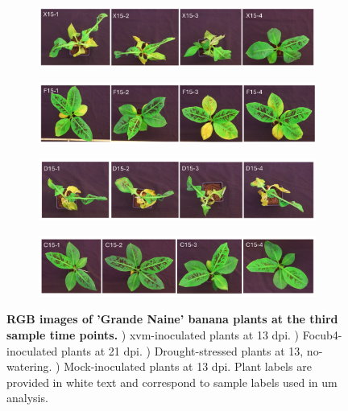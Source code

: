 \begin{figure}[ph!]
  \centering
  \begin{subfigure}[b]{\textwidth}
    \includegraphics[width=\textwidth]{Figures/ThirdTimePointXanthomonasBLQs.pdf}
    \caption{}
    \label{fig:XvmThirdTimeBLQs}
  \end{subfigure}
   \begin{subfigure}[b]{\textwidth}
    \includegraphics[width=\textwidth]{Figures/ThirdTimePointFusariumBLQs.pdf}
    \caption{}
    \label{fig:FocThirdTimeBLQs}
  \end{subfigure}
     \begin{subfigure}[b]{\textwidth}
    \includegraphics[width=\textwidth]{Figures/ThirdTimePointDroughtBLQs.pdf}
    \caption{}
    \label{fig:DroThirdTimeBLQs}
  \end{subfigure}
     \begin{subfigure}[b]{\textwidth}
    \includegraphics[width=\textwidth]{Figures/ThirdTimePointControlBLQs.pdf}
    \caption{}
    \label{fig:ConThirdTimeBLQs}
  \end{subfigure}
  \caption[RGB images of 'Grande Naine' banana plants at the third sample time points.]{\textbf{RGB images of 'Grande Naine' banana plants at the third sample time points.}
  \textbf{}) \acl{xvm}-inoculated plants at 13 \acl{dpi}.
  \textbf{}) \acl{Focub4}-inoculated plants at 21 \acl{dpi}.
  \textbf{}) Drought-stressed plants at 13, no-watering.
  \textbf{}) Mock-inoculated plants at 13 \ac{dpi}.
  Plant labels are provided in white text and correspond to sample labels used in \acl{um} analysis.
  }
  \label{fig:ThridTimePointSymptoms}
\end{figure}


